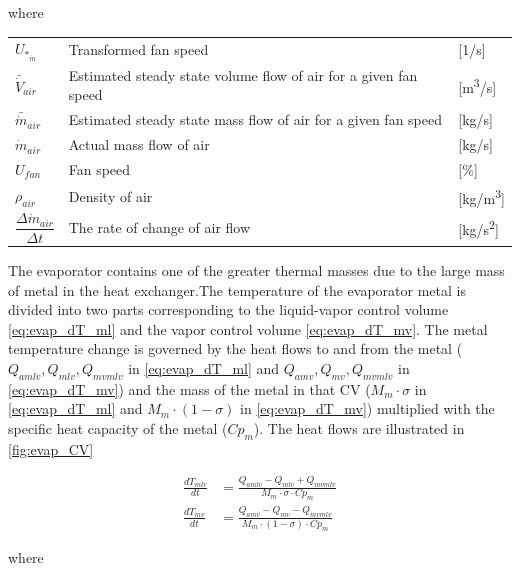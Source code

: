 where

\begin{center}
	\begin{tabular}{l p{8cm} l}
		$ 	U_{*_{\dot{m}}} $ 						& Transformed fan speed												& [1/\si{s}]\\
		$\bar{\dot{V}}_{air}$						& Estimated steady state volume flow of air for a given fan speed 	& [\si{m^3}/\si{s}] \\
		$\bar{\dot{m}}_{air}$						& Estimated steady state mass flow of air for a given fan speed 	& [\si{kg}/\si{s}] \\
		$\dot{m}_{air}$								& Actual mass flow of air					  						& [\si{kg}/\si{s}] \\
		$U_{fan}$									& Fan speed 														& [$\%$] \\
		$\rho_{air}$								& Density of air													& [\si{kg}/\si{m^3}] \\[0.2cm]
		$\dfrac{\Delta \dot{m}_{air}}{\Delta t} $ 	& The rate of change of	air flow 									& [\si{kg}/\si{s^2}]
	\end{tabular}
\end{center}

The evaporator contains one of the greater thermal masses due to the large mass of metal in the heat exchanger.The temperature of the evaporator metal is divided into two parts corresponding to the liquid-vapor control volume \cref{eq:evap_dT_ml} and the vapor control volume \cref{eq:evap_dT_mv}. The metal temperature change is governed by the heat flows to and from the metal ($ Q_{amlv}, Q_{mlv}, Q_{mvmlv} $ in \cref{eq:evap_dT_ml} and $ Q_{amv}, Q_{mv}, Q_{mvmlv} $ in \cref{eq:evap_dT_mv}) and the mass of the metal in that CV ($M_m \cdot \sigma$ in \cref{eq:evap_dT_ml} and $M_m \cdot (1 - \sigma)$ in \cref{eq:evap_dT_mv}) multiplied with the specific heat capacity of the metal ($Cp_m$). The heat flows are illustrated in \cref{fig:evap_CV}

\begin{align}
	\frac{dT_{mlv}}{dt} & = \frac{Q_{amlv}-Q_{mlv} + Q_{mvmlv}}{M_m \cdot \sigma \cdot Cp_m}        \label{eq:evap_dT_ml} \\
	\frac{dT_{mv}}{dt} & = \frac{Q_{amv} - Q_{mv} - Q_{mvmlv}}{M_m \cdot (1 - \sigma) \cdot Cp_m } \label{eq:evap_dT_mv}
\end{align}

where

